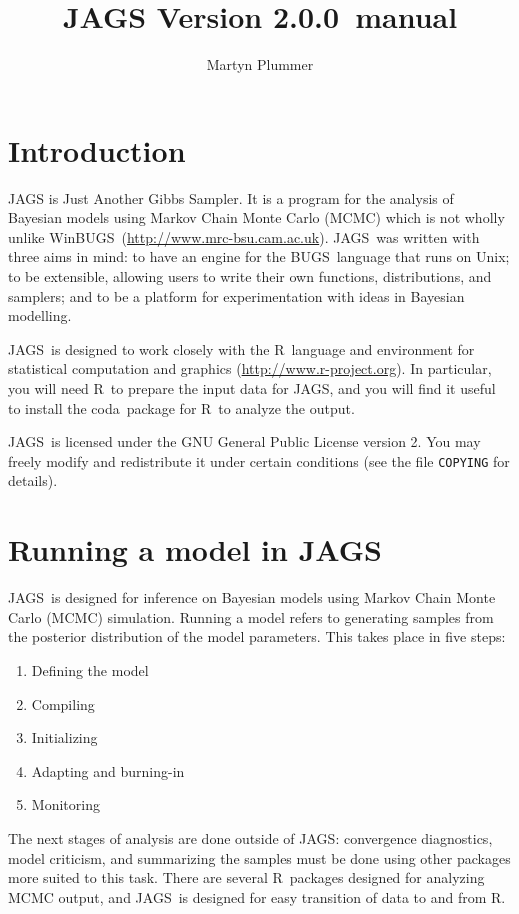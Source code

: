 \documentclass[11pt, a4paper, titlepage]{report}
\newcommand{\release}{2.0.0}
\newcommand{\JAGS}{\textsf{JAGS}}
\newcommand{\BUGS}{\textsf{BUGS}}
\newcommand{\WinBUGS}{\textsf{WinBUGS}}
\newcommand{\R}{\textsf{R}}
\newcommand{\CODA}{\textsf{coda}}
\begin{document}
\title{JAGS Version \release\ manual}
\author{Martyn Plummer}
\maketitle

\tableofcontents

\chapter{Introduction}

JAGS is Just Another Gibbs Sampler.  It is a program for the analysis
of Bayesian models using Markov Chain Monte Carlo (MCMC) which is not
wholly unlike
\WinBUGS\ (\url{http://www.mrc-bsu.cam.ac.uk}). \JAGS\ was written
with three aims in mind: to have an engine for the \BUGS\ language
that runs on Unix; to be extensible, allowing users to write their own
functions, distributions, and samplers; and to be a platform for
experimentation with ideas in Bayesian modelling.

\JAGS\ is designed to work closely with the \R\ language and
environment for statistical computation and graphics
(\url{http://www.r-project.org}).  In particular, you will need \R\ to
prepare the input data for \JAGS, and you will find it useful to
install the \CODA\ package for \R\ to analyze the output.

\JAGS\ is licensed under the GNU General Public License
version 2. You may freely modify and redistribute it under certain
conditions (see the file \texttt{COPYING} for details).

\chapter{Running a model in \JAGS}

\JAGS\ is designed for inference on Bayesian models using Markov Chain
Monte Carlo (MCMC) simulation.  Running a model refers to generating
samples from the posterior distribution of the model parameters.  This
takes place in five steps:
\begin{enumerate}
\item Defining the model
\item Compiling
\item Initializing
\item Adapting and burning-in
\item Monitoring
\end{enumerate}
The next stages of analysis are done outside of \JAGS: convergence
diagnostics, model criticism, and summarizing the samples must be done
using other packages more suited to this task. There are several
\R\ packages designed for analyzing MCMC output, and \JAGS\ is
designed for easy transition of data to and from \R.
\end{document}
